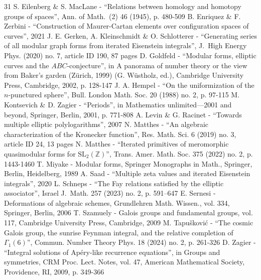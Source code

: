 \documentclass[10pt,a4paper]{article}
\numberwithin{equation}{section}
\theoremstyle{plain}
\theoremstyle{definition}
\begin{document}
\begin{thebibliography}{31}
S. Eilenberg \& S. MacLane - “Relations between homology and homotopy groups of spaces”, Ann. of Math. (2) 46 (1945), p. 480-509
B. Enriquez \& F. Zerbini - “Construction of Maurer-Cartan elements over configuration spaces of curves”, 2021
J. E. Gerken, A. Kleinschmidt \& O. Schlotterer - “Generating series of all modular graph forms from iterated Eisenstein integrals”, J. High Energy Phys. (2020) no. 7, article ID 190, 87 pages
D. Goldfeld - “Modular forms, elliptic curves and the $ABC$-conjecture”, in A panorama of number theory or the view from Baker’s garden (Zürich, 1999) (G. Wüstholz, ed.), Cambridge University Press, Cambridge, 2002, p. 128-147
J. A. Hempel - “On the uniformization of the $n$-punctured sphere”, Bull. London Math. Soc. 20 (1988) no. 2, p. 97-115
M. Kontsevich \& D. Zagier - “Periods”, in Mathematics unlimited—2001 and beyond, Springer, Berlin, 2001, p. 771-808
A. Levin \& G. Racinet - “Towards multiple elliptic polylogarithms”, 2007
N. Matthes - “An algebraic characterization of the Kronecker function”, Res. Math. Sci. 6 (2019) no. 3, article ID 24, 13 pages
N. Matthes - “Iterated primitives of meromorphic quasimodular forms for $\mathrm{SL}_2(\mathbb{Z})$”, Trans. Amer. Math. Soc. 375 (2022) no. 2, p. 1443-1460
T. Miyake - Modular forms, Springer Monographs in Math., Springer, Berlin, Heidelberg, 1989
A. Saad - “Multiple zeta values and iterated Eisenstein integrals”, 2020
L. Schneps - “The Fay relations satisfied by the elliptic associator”, Israel J. Math. 257 (2023) no. 2, p. 591–647
E. Sernesi - Deformations of algebraic schemes, Grundlehren Math. Wissen., vol. 334, Springer, Berlin, 2006
T. Szamuely - Galois groups and fundamental groups, vol. 117, Cambridge University Press, Cambridge, 2009
M. Tapušković - “The cosmic Galois group, the sunrise Feynman integral, and the relative completion of $\Gamma _1(6)$”, Commun. Number Theory Phys. 18 (2024) no. 2, p. 261-326
D. Zagier - “Integral solutions of Apéry-like recurrence equations”, in Groups and symmetries, CRM Proc. Lect. Notes, vol. 47, American Mathematical Society, Providence, RI, 2009, p. 349-366
\end{thebibliography}
\end{document}
